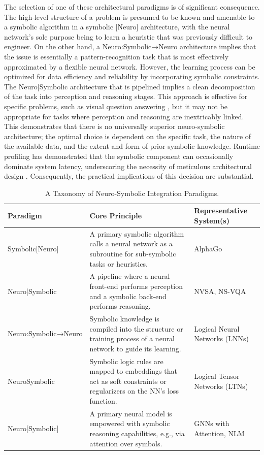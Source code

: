 \documentclass[12pt, a4paper]{report}
\begin{document}
The selection of one of these architectural paradigms is of significant consequence. The high-level structure of a problem is presumed to be known and amenable to a symbolic algorithm in a symbolic [Neuro] architecture, with the neural network's sole purpose being to learn a heuristic that was previously difficult to engineer. On the other hand, a Neuro:Symbolic→Neuro architecture implies that the issue is essentially a pattern-recognition task that is most effectively approximated by a flexible neural network. However, the learning process can be optimized for data efficiency and reliability by incorporating symbolic constraints. The Neuro|Symbolic architecture that is pipelined implies a clean decomposition of the task into perception and reasoning stages. This approach is effective for specific problems, such as visual question answering \citep{cranmer2020interpretable}, but it may not be appropriate for tasks where perception and reasoning are inextricably linked. This demonstrates that there is no universally superior neuro-symbolic architecture; the optimal choice is dependent on the specific task, the nature of the available data, and the extent and form of prior symbolic knowledge. Runtime profiling has demonstrated that the symbolic component can occasionally dominate system latency, underscoring the necessity of meticulous architectural design \citep{chaudhuri2021neurosymbolic}. Consequently, the practical implications of this decision are substantial.

\begin{table}[ht]
\centering
\caption{A Taxonomy of Neuro-Symbolic Integration Paradigms.}
\label{tab:neuro_symbolic_taxonomy}
\begin{tabular}{|p{}|p{}|p{}|}
\hline
\textbf{Paradigm} & \textbf{Core Principle} & \textbf{Representative System(s)} \\
\hline
Symbolic[Neuro] & A primary symbolic algorithm calls a neural network as a subroutine for sub-symbolic tasks or heuristics. & AlphaGo \citep{chaudhuri2021neurosymbolic} \\
\hline
Neuro|Symbolic & A pipeline where a neural front-end performs perception and a symbolic back-end performs reasoning. & NVSA, NS-VQA \citep{chaudhuri2021neurosymbolic} \\
\hline
Neuro:Symbolic→Neuro & Symbolic knowledge is compiled into the structure or training process of a neural network to guide its learning. & Logical Neural Networks (LNNs) \citep{chaudhuri2021neurosymbolic} \\
\hline
NeuroSymbolic & Symbolic logic rules are mapped to embeddings that act as soft constraints or regularizers on the NN's loss function. & Logical Tensor Networks (LTNs) \citep{badreddine2022logical} \\
\hline
Neuro[Symbolic] & A primary neural model is empowered with symbolic reasoning capabilities, e.g., via attention over symbols. & GNNs with Attention, NLM \citep{chaudhuri2021neurosymbolic} \\
\hline
\end{tabular}
\end{table}
\end{document}
